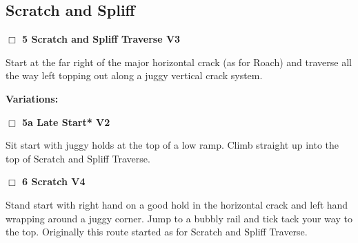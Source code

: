 	\begin{multicols}{2}

\needspace{10em}
\subsection*{Scratch and Spliff}\label{bf:Scratch and Spliff}




\needspace{2em}
\label{rt:Scratch and Spliff Traverse}
\colorbox{green!20}{
\parbox{0.95\linewidth}{
\hspace{-1ex}\textbf{$\Box$
5 Scratch and Spliff Traverse V3  
}}}
\begin{adjustwidth}{1.3em}{}			

Start at the far right of the major horizontal crack (as for Roach) and traverse all the way left topping out along a juggy vertical crack system.
\end{adjustwidth}


\begin{adjustwidth}{0.5cm}{}				
\needspace{4em}
\textbf{Variations:} \newline

\needspace{2em}
\label{vr:Late Start}
\colorbox{green!20}{
\parbox{0.95\linewidth}{
\hspace{-1ex}\textbf{$\Box$
5a Late Start* V2  
}}}
\begin{adjustwidth}{1.3em}{}			

Sit start with juggy holds at the top of a low ramp. Climb straight up into the top of Scratch and Spliff Traverse.
\end{adjustwidth}



\end{adjustwidth}


\needspace{2em}
\label{rt:Scratch}
\colorbox{RoyalBlue!20}{
\parbox{0.95\linewidth}{
\hspace{-1ex}\textbf{$\Box$
6 Scratch V4  
}}}
\begin{adjustwidth}{1.3em}{}			

Stand start with right hand on a good hold in the horizontal crack and left hand wrapping around a juggy corner. Jump to a bubbly rail and tick tack your way to the top. Originally this route started as for Scratch and Spliff Traverse.
\end{adjustwidth}




\end{multicols}
